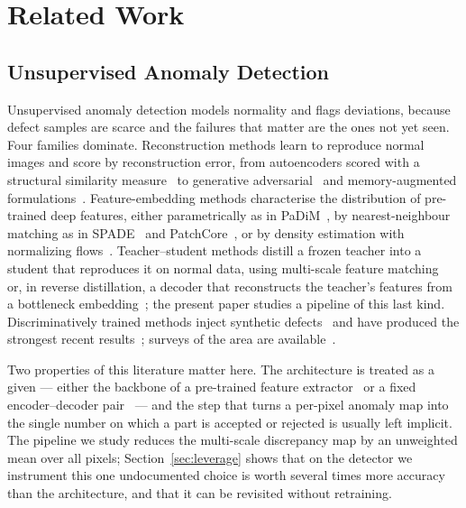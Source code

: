 
\section{Related Work}
\label{sec:related_work}

\subsection{Unsupervised Anomaly Detection}
\label{subsec:related_ad}

Unsupervised anomaly detection models normality and flags deviations, because
defect samples are scarce and the failures that matter are the ones not yet seen.
Four families dominate. Reconstruction methods learn to reproduce normal images
and score by reconstruction error, from autoencoders scored with a structural
similarity measure~\cite{bergmann2018improving} to generative
adversarial~\cite{akcay2019ganomaly,schlegl2019f} and memory-augmented
formulations~\cite{gong2019memorizing}. Feature-embedding methods characterise
the distribution of pre-trained deep features, either parametrically as in
PaDiM~\cite{defard2021padim}, by nearest-neighbour matching as in
SPADE~\cite{cohen2020spade} and PatchCore~\cite{roth2022patchcore}, or by density
estimation with normalizing flows~\cite{yu2021fastflow}. Teacher--student methods
distill a frozen teacher into a student that reproduces it on normal data, using
multi-scale feature matching~\cite{wang2021stpm,bergmann2020uninformed} or, in
reverse distillation, a decoder that reconstructs the teacher's features from a
bottleneck embedding~\cite{deng2022reverse}; the present paper studies a pipeline
of this last kind. Discriminatively trained methods inject synthetic
defects~\cite{zavrtanik2021draem} and have produced the strongest recent
results~\cite{liu2023simplenet,batzner2024efficientad,guo2025dinomaly,lee2022cfa};
surveys of the area are available~\cite{liu2024deep}.

Two properties of this literature matter here. The architecture is treated as a
given --- either the backbone of a pre-trained feature
extractor~\cite{defard2021padim,roth2022patchcore} or a fixed encoder--decoder
pair~\cite{deng2022reverse} --- and the step that turns a per-pixel anomaly map
into the single number on which a part is accepted or rejected is usually left
implicit. The pipeline we study reduces the multi-scale discrepancy map by an
unweighted mean over all pixels; Section~\ref{sec:leverage} shows that on the
detector we instrument this one
undocumented choice is worth several times more accuracy than the architecture,
and that it can be revisited without retraining.


